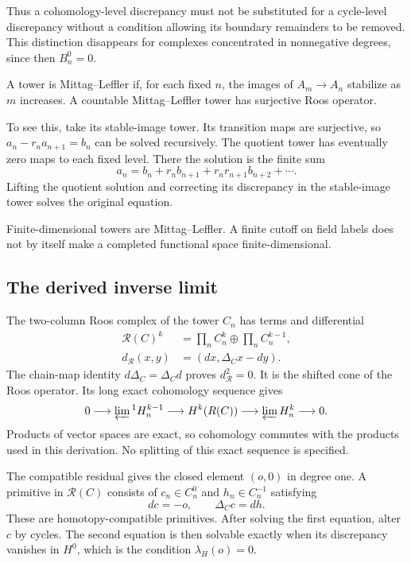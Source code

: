 Thus a cohomology-level discrepancy must not be substituted for a
cycle-level discrepancy without a condition allowing its boundary
remainders to be removed. This distinction disappears for complexes
concentrated in nonnegative degrees, since then $B^0_n=0$.

A tower is Mittag--Leffler if, for each fixed $n$, the images of
$A_m\to A_n$ stabilize as $m$ increases. A countable
Mittag--Leffler tower has surjective Roos operator.

To see this, take its stable-image tower. Its transition maps are
surjective, so $a_n-r_na_{n+1}=b_n$ can be solved recursively.
The quotient tower has eventually zero maps to each fixed level.
There the solution is the finite sum
\[
 a_n=b_n+r_nb_{n+1}+r_nr_{n+1}b_{n+2}+\cdots.
\]
Lifting the quotient solution and correcting its discrepancy in
the stable-image tower solves the original equation.

Finite-dimensional towers are Mittag--Leffler. A finite cutoff on
field labels does not by itself make a completed functional space
finite-dimensional.

\subsection*{The derived inverse limit}

The two-column Roos complex of the tower $C_n$ has terms and
differential
\begin{equation}\label{mht:eq:derived-roos-complex}
 \begin{split}
 \mathcal R(C)^k&=\prod_n C_n^k\oplus\prod_n C_n^{k-1},\\
 d_{\mathcal R}(x,y)&=(dx,\Delta_Cx-dy).
 \end{split}
\end{equation}
The chain-map identity $d\Delta_C=\Delta_Cd$ proves
$d_{\mathcal R}^2=0$. It is the shifted cone of the Roos operator.
Its long exact cohomology sequence gives
\begin{equation}\label{mht:eq:milnor-roos-sequence}
 0\longrightarrow\varprojlim{}^1 H^{k-1}_n
 \longrightarrow H^k(\mathcal R(C))
 \longrightarrow\varprojlim H^k_n\longrightarrow0.
\end{equation}
Products of vector spaces are exact, so cohomology commutes with
the products used in this derivation. No splitting of this exact
sequence is specified.

The compatible residual gives the closed element $(o,0)$ in degree
one. A primitive in $\mathcal R(C)$ consists of $c_n\in C_n^0$
and $h_n\in C_n^{-1}$ satisfying
\[
 dc=-o,\qquad \Delta_Cc=dh.
\]
These are homotopy-compatible primitives. After solving the first equation, alter $c$ by cycles.
The second equation is then solvable exactly when its discrepancy
vanishes in $H^0$, which is the condition $\lambda_H(o)=0$.


